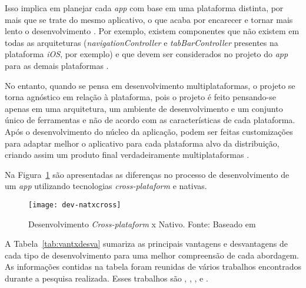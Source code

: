 Isso implica em planejar cada \textit{app} com base em uma plataforma distinta, por mais que se trate do mesmo aplicativo, o que acaba por encarecer 
e tornar mais lento o desenvolvimento \cite{kassas_taxonomy_2015}. Por exemplo, existem componentes que não existem em todas as arquiteturas (\textit{navigationController} e 
\textit{tabBarController} presentes na plataforma \textit{iOS}, por exemplo) e que devem ser considerados no projeto do \textit{app} para as demais plataformas \cite{shakshuki_4th_2013}.

No entanto, quando se pensa em desenvolvimento multiplataformas, o projeto se torna agnóstico em relação à plataforma, pois o projeto é feito pensando-se 
apenas em uma arquitetura, um ambiente de desenvolvimento e um conjunto único de ferramentas e não de acordo com as características de cada plataforma. Após o desenvolvimento do núcleo da
aplicação, podem ser feitas customizações para adaptar melhor o aplicativo para cada plataforma alvo da distribuição, criando assim um produto final verdadeiramente multiplataformas \cite{corral_ant_2012}.

Na Figura~\ref{fig:dev-natxcross} são apresentadas as diferenças no processo de desenvolvimento de um \textit{app} utilizando tecnologias \textit{cross-plataform} e 
nativas.

\begin{figure}[H]
  \centering
    \texttt{[image: dev-natxcross]}
    \caption[Desenvolvimento \textit{Cross-plataform} x Nativo]{ Desenvolvimento \textit{Cross-plataform} x Nativo. Fonte: Baseado em \cite{corral_ant_2012}}
	\label{fig:dev-natxcross}
\end{figure}

A Tabela~\ref{tab:vantxdesva} sumariza as principais vantagens e desvantagens de cada tipo de desenvolvimento para uma melhor compreensão de cada abordagem. 
As informações contidas na tabela foram reunidas de vários trabalhos encontrados durante a pesquisa realizada. Esses trabalhos são , 
, ,  e . 


